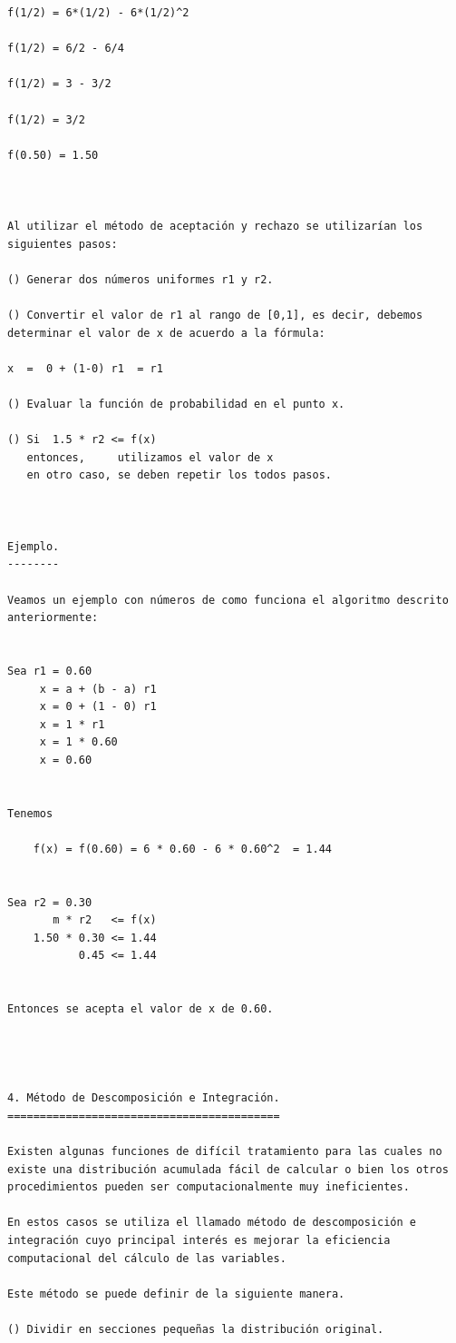 \begin{verbatim}
f(1/2) = 6*(1/2) - 6*(1/2)^2

f(1/2) = 6/2 - 6/4

f(1/2) = 3 - 3/2

f(1/2) = 3/2

f(0.50) = 1.50



Al utilizar el método de aceptación y rechazo se utilizarían los siguientes pasos:

() Generar dos números uniformes r1 y r2.

() Convertir el valor de r1 al rango de [0,1], es decir, debemos determinar el valor de x de acuerdo a la fórmula:

x  =  0 + (1-0) r1  = r1

() Evaluar la función de probabilidad en el punto x.

() Si  1.5 * r2 <= f(x)
   entonces,     utilizamos el valor de x 
   en otro caso, se deben repetir los todos pasos.



Ejemplo.
--------

Veamos un ejemplo con números de como funciona el algoritmo descrito anteriormente:


Sea r1 = 0.60
     x = a + (b - a) r1
     x = 0 + (1 - 0) r1
     x = 1 * r1 
     x = 1 * 0.60
     x = 0.60


Tenemos
                                        
    f(x) = f(0.60) = 6 * 0.60 - 6 * 0.60^2  = 1.44


Sea r2 = 0.30
       m * r2   <= f(x)
    1.50 * 0.30 <= 1.44
           0.45 <= 1.44


Entonces se acepta el valor de x de 0.60.




4. Método de Descomposición e Integración.
==========================================

Existen algunas funciones de difícil tratamiento para las cuales no existe una distribución acumulada fácil de calcular o bien los otros procedimientos pueden ser computacionalmente muy ineficientes.

En estos casos se utiliza el llamado método de descomposición e integración cuyo principal interés es mejorar la eficiencia computacional del cálculo de las variables.

Este método se puede definir de la siguiente manera.

() Dividir en secciones pequeñas la distribución original.


\end{verbatim}
